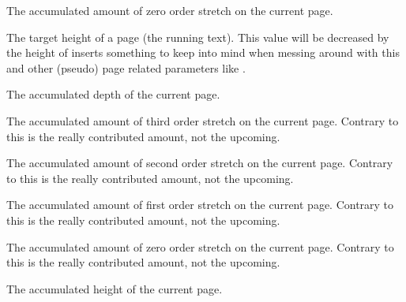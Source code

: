 \startnewprimitive[title={\prm {pagefistretch}}]

The accumulated amount of zero order stretch on the current page.

\stopnewprimitive

\startoldprimitive[title={\prm {pagegoal}}]

The target height of a page (the running text). This value will be decreased by
the height of inserts something to keep into mind when messing around with this
and other (pseudo) page related parameters like .

\stopoldprimitive

\startnewprimitive[title={\prm {pagelastdepth}}]

The accumulated depth of the current page.

\stopnewprimitive

\startnewprimitive[title={\prm {pagelastfilllstretch}}]

The accumulated amount of third order stretch on the current page. Contrary to
 this is the really contributed amount, not the upcoming.

\stopnewprimitive

\startnewprimitive[title={\prm {pagelastfillstretch}}]

The accumulated amount of second order stretch on the current page. Contrary to
 this is the really contributed amount, not the upcoming.

\stopnewprimitive

\startnewprimitive[title={\prm {pagelastfilstretch}}]

The accumulated amount of first order stretch on the current page. Contrary to
 this is the really contributed amount, not the upcoming.

\stopnewprimitive

\startnewprimitive[title={\prm {pagelastfistretch}}]

The accumulated amount of zero order stretch on the current page. Contrary to
 this is the really contributed amount, not the upcoming.

\stopnewprimitive

\startnewprimitive[title={\prm {pagelastheight}}]

The accumulated height of the current page.

\stopnewprimitive

\startnewprimitive[title={\prm {pagelastshrink}}]

